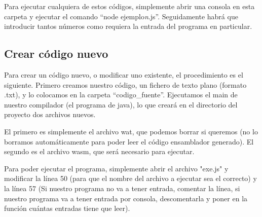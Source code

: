 \documentclass{article}
\begin{document}
Para ejecutar cualquiera de estos códigos, simplemente abrir una consola en esta carpeta y ejecutar el comando ``node ejemplo\textit{n}.js''. Seguidamente habrá que introducir tantos números como requiera la entrada del programa en particular.

\subsection{Crear código nuevo}
Para crear un código nuevo, o modificar uno existente, el procedimiento es el siguiente. Primero creamos nuestro código, un fichero de texto plano (formato .txt), y lo colocamos en la carpeta ``codigo\_fuente''. Ejecutamos el main de nuestro compilador (el programa de java), lo que creará en el directorio del proyecto dos archivos nuevos.

El primero es simplemente el archivo wat, que podemos borrar si queremos (no lo borramos automáticamente para poder leer el código ensamblador generado). El segundo es el archivo wasm, que será necesario para ejecutar.

Para poder ejecutar el programa, simplemente abrir el archivo "exe.js" y modificar la línea 50 (para que el nombre del archivo a ejecutar sea el correcto) y la línea 57 (Si nuestro programa no va a tener entrada, comentar la línea, si nuestro programa va a tener entrada por consola, descomentarla y poner en la función cuántas entradas tiene que leer).
\end{document}
